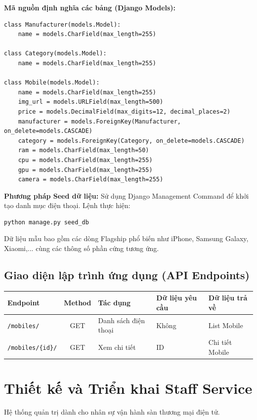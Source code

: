 \documentclass[12pt,a4paper]{report}
\begin{document}
\textbf{Mã nguồn định nghĩa các bảng (Django Models):}
\begin{verbatim}
class Manufacturer(models.Model):
    name = models.CharField(max_length=255)

class Category(models.Model):
    name = models.CharField(max_length=255)

class Mobile(models.Model):
    name = models.CharField(max_length=255)
    img_url = models.URLField(max_length=500)
    price = models.DecimalField(max_digits=12, decimal_places=2)
    manufacturer = models.ForeignKey(Manufacturer, on_delete=models.CASCADE)
    category = models.ForeignKey(Category, on_delete=models.CASCADE)
    ram = models.CharField(max_length=50)
    cpu = models.CharField(max_length=255)
    gpu = models.CharField(max_length=255)
    camera = models.CharField(max_length=255)
\end{verbatim}

\textbf{Phương pháp Seed dữ liệu:}
Sử dụng Django Management Command để khởi tạo danh mục điện thoại. Lệnh thực hiện:
\begin{verbatim}
python manage.py seed_db
\end{verbatim}
Dữ liệu mẫu bao gồm các dòng Flagship phổ biến như iPhone, Samsung Galaxy, Xiaomi,... cùng các thông số phần cứng tương ứng.

\subsection{Giao diện lập trình ứng dụng (API Endpoints)}
\begin{table}[h!]
\centering
\begin{tabular}{|l|c|p{4cm}|p{3cm}|p{3cm}|}
\hline
\textbf{Endpoint} & \textbf{Method} & \textbf{Tác dụng} & \textbf{Dữ liệu yêu cầu} & \textbf{Dữ liệu trả về} \\ \hline
\texttt{/mobiles/} & GET & Danh sách điện thoại & Không & List Mobile \\ \hline
\texttt{/mobiles/\{id\}/} & GET & Xem chi tiết & ID & Chi tiết Mobile \\ \hline
\end{tabular}
\end{table}

\section{Thiết kế và Triển khai Staff Service}
Hệ thống quản trị dành cho nhân sự vận hành sàn thương mại điện tử.
\end{document}
